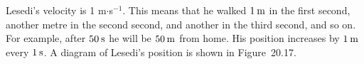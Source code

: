     
        
        \label{m38795*id70029}Lesedi's velocity is 1 m\begin{math}\ensuremath{\cdot}\end{math}s\begin{math}{}^{-1}\end{math}. This means that he walked \begin{math}1\phantom{\rule{2pt}{0ex}}\mathrm{m}\end{math} in the first second, another metre in the second second, and another in the third second, and so on. For example, after \begin{math}50\phantom{\rule{2pt}{0ex}}\mathrm{s}\end{math} he will be \begin{math}50\phantom{\rule{2pt}{0ex}}\mathrm{m}\end{math} from home. His position increases by \begin{math}1\phantom{\rule{2pt}{0ex}}\mathrm{m}\end{math} every \begin{math}1\phantom{\rule{2pt}{0ex}}\mathrm{s}\end{math}. A diagram of Lesedi's position is shown in Figure~20.17.\par 
        
